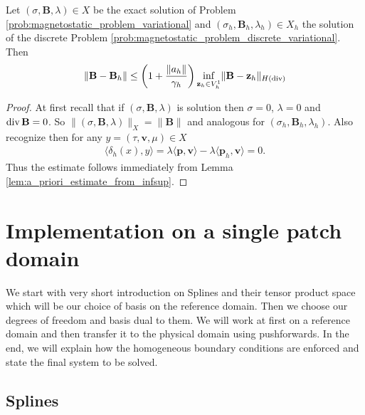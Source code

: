 \documentclass[../master_thesis.tex]{subfiles}
\begin{document}
\begin{theorem}
    Let $(\sigma,\mathbf{B},\lambda) \in X$ be 
    the exact solution of Problem \ref{prob:magnetostatic_problem_variational} 
    and 
    $(\sigma_h,\mathbf{B}_h,\lambda_h) \in X_h$ the solution of the discrete 
    Problem \ref{prob:magnetostatic_problem_discrete_variational}. Then 
    \begin{align*}
        \lVert \mathbf{B} - \mathbf{B}_h \rVert 
        \leq \left( 1 + \frac{\lVert a_h \rVert}{\gamma_h} \right)
            \inf_{\mathbf{z}_h \in V_h^1} \lVert \mathbf{B} - \mathbf{z}_h \rVert _{H(\operatorname{div})} 
    \end{align*}
\end{theorem}
\begin{proof}
    At first recall that if $(\sigma,\mathbf{B},\lambda)$ is solution then 
    $\sigma = 0$, $\lambda = 0$ and $\operatorname{div} \mathbf{B}=0$. 
    So $\lVert (\sigma,\mathbf{B},\lambda) \rVert _X = \lVert \mathbf{B} \rVert $
    and analogous for $(\sigma_h,\mathbf{B}_h,\lambda_h)$.
    Also recognize then for any $y = (\tau,\mathbf{v}, \mu) \in X$
    \begin{align*}
        \langle \delta_h(x), y \rangle = \lambda \langle \mathbf{p}, \mathbf{v} \rangle 
        - \lambda \langle \mathbf{p}_h, \mathbf{v} \rangle = 0.
    \end{align*}
    Thus the estimate follows immediately from Lemma \ref{lem:a_priori_estimate_from_infsup}.
\end{proof}

\section{Implementation on a single patch domain}

We start with very short introduction on Splines and their tensor product space which 
will be our choice of basis on the reference domain. Then we 
choose our degrees of freedom and basis dual to them. We will work at first 
on a reference domain and then transfer it to the physical domain 
using pushforwards. In the end, we will explain how the homogeneous boundary 
conditions are enforced and state the final system to be solved.

\subsection{Splines}
\end{document}
